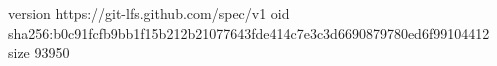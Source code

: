 version https://git-lfs.github.com/spec/v1
oid sha256:b0c91fcfb9bb1f15b212b21077643fde414c7e3c3d6690879780ed6f99104412
size 93950
